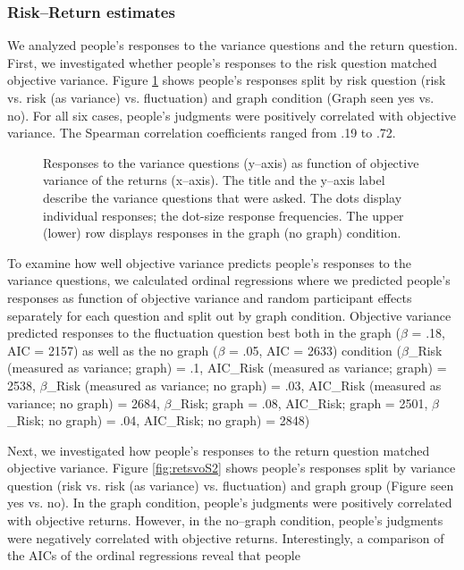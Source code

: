 \documentclass[a4paper,man, natbib,floatsintext]{apa6} %
\begin{document}
\subsubsection{Risk--Return estimates}
We analyzed people's responses to the variance questions and the return question. First, we investigated whether people's responses to the risk question matched objective variance. Figure \ref{fig:rsvoS2} shows people's responses split by risk question (risk vs. risk (as variance) vs. fluctuation) and graph condition (Graph seen yes vs. no). For all six cases, people's judgments were positively correlated with objective variance. The Spearman correlation coefficients ranged from .19 to .72.
\begin{figure}[!htbp] 
  \centering
  \caption{Responses to the variance questions (y--axis) as function of objective variance of the returns (x--axis). The title and the y--axis label describe the variance questions that were asked. The dots display individual responses; the dot-size response frequencies. The upper (lower) row displays responses in the graph (no graph) condition. }
  \label{fig:rsvoS2}
\end{figure}
To examine how well objective variance predicts people's responses to the variance questions, we calculated ordinal regressions where we predicted people's responses as function of objective variance and random participant effects separately for each question and split out by graph condition. Objective variance predicted responses to the fluctuation question best both in the graph ($\beta$ = .18, AIC = 2157) as well as the no graph ($\beta$ = .05, AIC = 2633) condition ($\beta$_{Risk (measured as variance; graph)} = .1, AIC_{Risk (measured as variance; graph)} = 2538, $\beta$_{Risk (measured as variance; no graph)} = .03, AIC_{Risk (measured as variance; no graph)} = 2684, 
$\beta$_{Risk; graph} = .08, AIC_{Risk; graph} = 2501, $\beta$_{Risk; no graph)} = .04, AIC_{Risk; no graph)} = 2848)


Next, we investigated how people's responses to the return question matched objective variance. Figure \ref{fig:retsvoS2} shows people's responses split by variance question (risk vs. risk (as variance) vs. fluctuation) and graph group (Figure seen yes vs. no). In the graph condition, people's judgments were positively correlated with objective returns. However, in the no--graph condition, people's judgments were negatively correlated with objective returns. Interestingly, a comparison of the AICs of the ordinal regressions reveal that people
\end{document}
